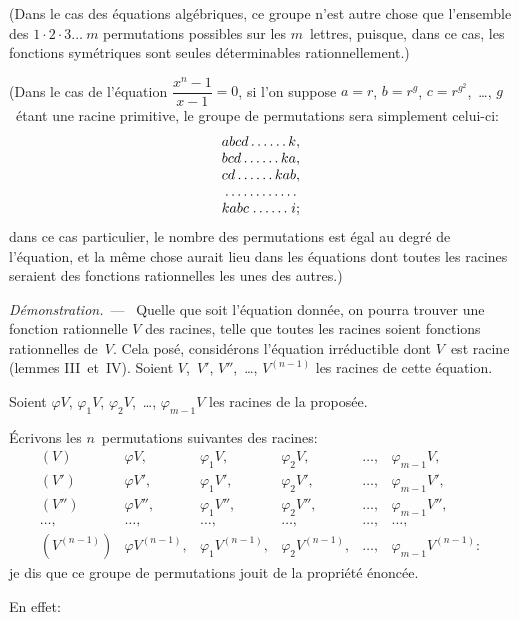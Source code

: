 \documentclass[leqno,12pt]{book}[2005/09/16]
\newcommand{\Par}[1]{\medskip\par\textit{#1}\ ---\ \ignorespaces}
\renewcommand{\phi}{\varphi}
\begin{document}
(Dans le cas des équations algébriques, ce groupe n'est autre
chose que l'ensemble des $1 · 2 · 3 \dots\ m$ permutations possibles
sur les $m$~lettres, puisque, dans ce cas, les fonctions symétriques
sont seules déterminables rationnellement.)

(Dans le cas de l'équation $\dfrac{x^{n} - 1}{x - 1} = 0$, si l'on suppose $a = r$,
$b = r^{g}$, $c = r^{g^{2}}$,~\dots, $g$~étant une racine primitive, le groupe de
permutations sera simplement celui-ci:
\[
\begin{array}{c}
  abcd \dots\dots k, \\
  bcd  \dotfill  ka, \\
  cd   \dotfill kab, \\
       \dotfill      \\
  kabc \dotfill   i;
\end{array}
\]
dans ce cas particulier, le nombre des permutations est égal au
degré de l'équation, et la même chose aurait lieu dans les équations
dont toutes les racines seraient des fonctions rationnelles
les unes des autres.)

\Par{Démonstration.} Quelle que soit l'équation donnée, on pourra
trouver une fonction rationnelle $V$ des racines, telle que toutes
les racines soient fonctions rationnelles de~$V$. Cela posé, considérons
l'équation irréductible dont $V$~est racine (lemmes III~et~IV)\@.
Soient $V$,~$V'$, $V''$,~\dots, $V^{(n-1)}$ les racines de cette équation.

Soient $\phi V$, $\phi_{1} V$, $\phi_{2} V$,~\dots, $\phi_{m-1} V$ les racines de la proposée.

Écrivons les $n$~permutations suivantes des racines:
\[
\begin{array}{*{6}{l}}
(V)       & \phi V,  & \phi_{1} V,  & \phi_{2} V,  & \dots, & \phi_{m-1} V,\\
(V')      & \phi V', & \phi_{1} V', & \phi_{2} V', & \dots, & \phi_{m-1} V',\\
(V'')     & \phi V'',& \phi_{1} V'',& \phi_{2} V'',& \dots, & \phi_{m-1} V'',\\
\dots,    & \dots,   & \dots,     & \dots,     & \dots, & \dots, \\
(V^{(n-1)})& \phi V^{(n-1)},& \phi_{1} V^{(n-1)},& \phi_{2} V^{(n-1)},& \dots, & \phi_{m-1} V^{(n-1)}:
\end{array}
\]
je dis que ce groupe de permutations jouit de la propriété énoncée.

En effet:
\end{document}
